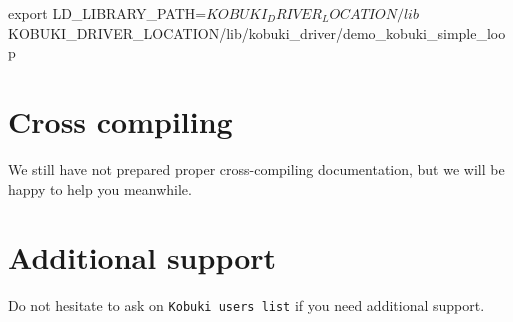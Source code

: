 \begin{DoxyCode}
  export LD_LIBRARY_PATH=$KOBUKI_DRIVER_LOCATION/lib
  $KOBUKI_DRIVER_LOCATION/lib/kobuki_driver/demo_kobuki_simple_loop
\end{DoxyCode}
\section{\-Cross compiling}\label{enInstallationLinuxGuide_crossc}
\-We still have not prepared proper cross-\/compiling documentation, but we will be happy to help you meanwhile.\section{\-Additional support}\label{enInstallationLinuxGuide_support}
\-Do not hesitate to ask on {\tt \-Kobuki users list} if you need additional support. 
